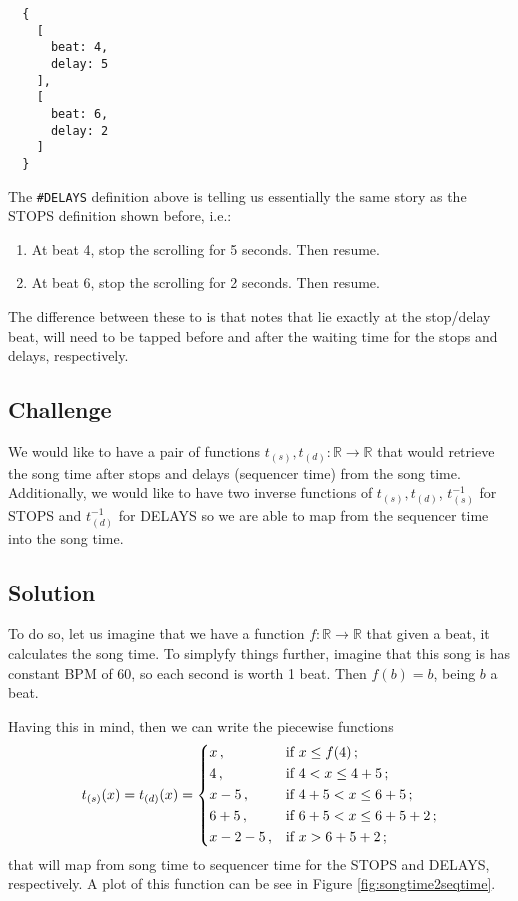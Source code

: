 \documentclass[a4paper,9pt]{article}
\begin{document}
    \begin{verbatim}
  {
    [
      beat: 4,
      delay: 5 
    ],
    [
      beat: 6,
      delay: 2 
    ]
  }
    \end{verbatim}
    The \texttt{\#DELAYS} definition above is telling us essentially the same story as the STOPS definition shown before, i.e.: 
    \begin{enumerate}
	    \item At beat 4, stop the scrolling for 5 seconds. Then resume.
	    \item At beat 6, stop the scrolling for 2 seconds. Then resume.
    \end{enumerate}

    The difference between these to is that notes that lie exactly at the stop/delay beat, will need to be tapped before and after the waiting time for the stops and delays, respectively.
    \subsection{Challenge}

    We would like to have a pair of functions $ t_{(s)}, t_{(d)}: \mathbb{R} \rightarrow \mathbb{R} $ that would retrieve the song time after stops and delays (sequencer time) from the song time. Additionally, we would like to have two inverse functions of $ t_{(s)}, t_{(d)} $, $ t^{-1}_{(s)} $ for STOPS and $ t^{-1}_{(d)} $ for DELAYS so we are able to map from the sequencer time into the song time.


    \subsection{Solution}

    To do so, let us imagine that we have a function $ f : \mathbb{R}\rightarrow \mathbb{R}$ that given a beat, it calculates the song time. To simplyfy things further, imagine that this song is has constant BPM of 60, so each second is worth 1 beat. Then $ f(b) = b $, being $ b $ a beat.

    Having this in mind, then we can write the piecewise functions
    \begin{equation}
	    t_{(s)}(x) = t_{(d)}(x) = \begin{dcases}
		    x\,, & \text{if $ x \leq f(4) $}\,; \\
		    4\,, & \text{if $4 <  x \leq 4+5 $}\,; \\
		    x-5\,, & \text{if $4 + 5 <  x \leq 6 + 5 $}\,; \\
		    6+5\,, & \text{if $6 + 5 <  x \leq 6 + 5+ 2 $}\,; \\
		    x-2-5\,, & \text{if $ x > 6+5+2 $}\,; \\
	    \end{dcases}
	    \label{l}
    \end{equation}
    that will map from song time to sequencer time for the STOPS and DELAYS, respectively. A plot of this function can be see in Figure \ref{fig:songtime2seqtime}. 
    
\end{document}
